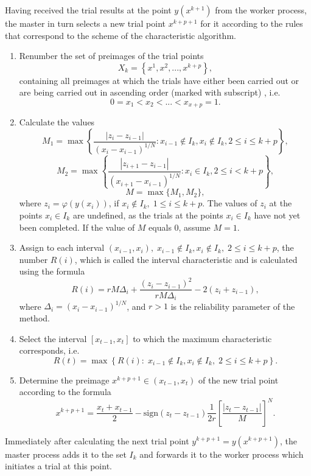\documentclass{svproc}
\begin{document}
Having received the trial results at the point $y(x^{k+1})$ from the worker process, the master in turn selects a new trial point $x^{k+p+1}$ for it according to the rules that correspond to the scheme of the characteristic algorithm.

\begin{enumerate}
	\item 
Renumber the set of preimages of the trial points 
\[
X_k = \left\{x^1, x^2,...,x^{k+p} \right\},
\]
containing all preimages at which the trials have either been carried out or are being carried out in ascending order (marked with subscript) , i.e.
\[
0=x_1<x_2<...<x_{x+p}=1.
\]
	\item
Calculate the values
\[
M_1=\max \left\{ \frac{ \left|z_i - z_{i-1} \right|}{(x_i-x_{i-1})^{1/N}} : x_{i-1} \notin I_k, x_i \notin I_k, 2\leq i\leq k+p \right\},
\]
\[
M_2=\max \left\{ \frac{ \left|z_{i+1} - z_{i-1} \right|}{(x_{i+1}-x_{i-1})^{1/N}} : x_i \in I_k, 2\leq i < k+p \right\},
\]
\[
M=\max\{M_1,M_2\},
\]
where $z_i=\varphi(y(x_i))$, if $x_i \notin I_k, \; 1\leq i \leq k+p$. The values of $z_i$ at the points $x_i \in I_k$ are undefined, as the trials at the points $x_i \in I_k$ have not yet been completed. If the value of $M$ equals 0, assume $M=1$.

	\item
Assign to each interval $(x_{i-1},x_i), \; x_{i-1} \notin I_k, x_i \notin I_k, \; 2\leq i\leq k+p$, the number $R(i)$, which is called the interval characteristic and is calculated using the formula
\begin{equation} \label{R}
R(i)=rM\Delta_i+\frac{(z_i-z_{i-1})^2}{rM\Delta_i}-2(z_i+z_{i-1}),
\end{equation}
where $\Delta_i=\left(x_i-x_{i-1}\right)^{1/N}$, and $r>1$ is the reliability parameter of the method.

	\item
Select the interval $[x_{t-1},x_t]$ to which the maximum characteristic corresponds, i.e.
\[
R(t) = \max \left\{ R(i): \; x_{i-1} \notin I_k, x_i \notin I_k, \; 2\leq i\leq k+p \right\}.
\]
	\item
Determine the preimage $x^{k+p+1} \in (x_{t-1},x_t)$ of the new trial point according to the formula
\[
x^{k+p+1} = \frac{x_{t}+x_{t-1}}{2} - \mathrm{sign}(z_{t}-z_{t-1})\frac{1}{2r}\left[\frac{\left|z_{t}-z_{t-1}\right|}{M}\right]^N.
\]
\end{enumerate}

Immediately after calculating the next trial point $y^{k+p+1} = y(x^{k+p+1})$, the master process adds it to the set $I_k$ and forwards it to the worker process which initiates a trial at this point.
\end{document}
